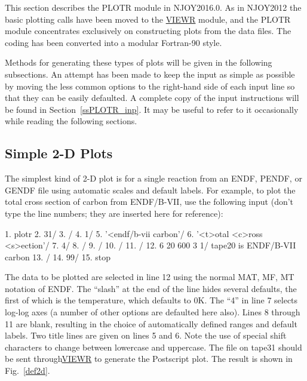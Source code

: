 This section describes the PLOTR module in NJOY2016.0.  As in
NJOY2012 the basic plotting calls have been moved to the
\hyperlink{sVIEWRhy}{VIEWR} module, and the PLOTR module concentrates
exclusively on constructing plots from the data files.  The
coding has been converted into a modular Fortran-90 style.

Methods for generating these types of plots will be given in the
following subsections.  An attempt has been made to keep the input as
simple as possible by moving the less common options to the
right-hand side of each input line so that they can be easily defaulted.
A complete copy of the input instructions will be found in
Section~\ref{ssPLOTR_inp}.  It may be useful to refer to it
occasionally while reading the following sections.

\subsection{Simple 2-D Plots}

The simplest kind of 2-D plot is for a single
reaction from an ENDF, PENDF, or GENDF file using automatic scales
and default labels.  For example, to plot the total cross section
of carbon from ENDF/B-VII, use the following input (don't type the
line numbers; they are inserted here for reference):

\small
\begin{ccode}

  1.  plotr
  2.  31/
  3.  /
  4.  1/
  5.  '<endf/b-vii carbon'/
  6.  '<t>otal <c>ross <s>ection'/
  7.  4/
  8.  /
  9.  /
 10.  /
 11.  /
 12.  6 20 600 3 1/ tape20 is ENDF/B-VII carbon
 13.  /
 14.  99/
 15.  stop

\end{ccode}
\normalsize

The data to be plotted are selected in line 12 using the normal
MAT, MF, MT notation of ENDF.  The ``slash'' at the end of the
line hides several defaults, the first of which is the temperature,
which defaults to 0K.  The ``4'' in line 7 selects log-log axes
(a number of other options are defaulted here also).  Lines 8
through 11 are blank, resulting in the choice of automatically
defined ranges and default labels.  Two title lines are given
on lines 5 and 6.  Note the use of special shift characters to
change between lowercase and uppercase.  The file on tape31
should be sent through\hyperlink{sVIEWRhy}{VIEWR}
to generate the Postscript plot.  The
result is shown in Fig.~\ref{def2d}.

